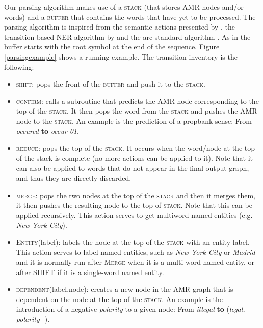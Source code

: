 \documentclass[11pt,a4paper]{article}
\begin{document}
Our parsing algorithm makes use of a \textsc{stack} (that stores AMR nodes and/or words) and 
a \textsc{buffer} that contains the words that have yet to be processed.  The parsing algorithm 
is inspired from the semantic actions presented by , the 
transition-based NER algorithm by  and the arc-standard algorithm  \cite{arcstd}. 
As in \cite{BallesterosN13} the buffer starts with the root symbol at the end of the sequence. 
Figure \ref{parsingexample} shows  a running example. 
The transition inventory is the following: 
\begin{itemize}

  \item \textsc{shift}: pops the front of the \textsc{buffer} and push it to the \textsc{stack}.
  
  \item \textsc{confirm}: calls a subroutine that predicts the AMR node corresponding to the top of 
  the \textsc{stack}. It then pops the word from the \textsc{stack} and pushes the 
  AMR node to the \textsc{stack}. An example is the prediction of a propbank sense: 
  From \emph{occured} \textbf{to} \emph{occur-01}.
  
    \item \textsc{reduce}: pops the top of the \textsc{stack}. It  
  occurs when the word/node at the top of the  stack is complete 
  (no more actions can be applied to it). Note that it can also be applied to words that do not 
  appear in the final output graph, and thus they are directly discarded.
  
  \item  \textsc{merge}: pops the two nodes at the top of the \textsc{stack} and then it merges them, 
  it then pushes the resulting node to the top of \textsc{stack}. Note that this can be applied recursively. 
  This  action serves to get multiword named entities (e.g. \emph{New York 
  City}).
  
  \item \textsc{Entity}(label): labels the node at the top of the \textsc{stack} 
  with an entity label. This action serves to label named entities, such as  \emph{New York City} or 
  \emph{Madrid} and it is normally run after \textsc{Merge} when it is a 
  multi-word named entity, or after \textsc{SHIFT} if it is a single-word named 
  entity.

  \item \textsc{dependent}(label,node): creates a new node in the AMR graph that is dependent on the 
  node at the top of the \textsc{stack}. An example is the 
  introduction of a negative \emph{polarity} to a given node: 
  From \emph{illegal} \textbf{to} (\emph{legal, polarity -}).


\end{itemize}
\end{document}
